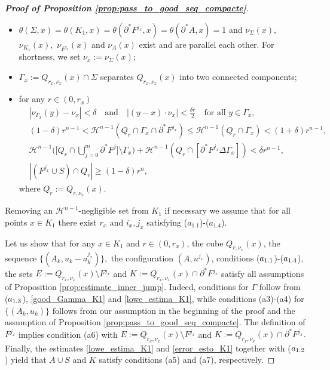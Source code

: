 \documentclass[reqno]{amsart}
\numberwithin{equation}{section}
\theoremstyle{plain}
\theoremstyle{definition}
\newcommand{\cH}{\mathcal{H}}
\newcommand{\p}{\partial}
\begin{document}
\begin{proof}[\textbf{Proof of Proposition \ref{prop:pass_to_good_seq_compacte}}]
\begin{itemize}
\item[($\rm a_{1.2}$)] 
$\theta(\Sigma,x) = \theta(K_1,x) =
\theta(\p^*F^{j_x},x) = 
\theta(\p^*A,x)=1$ and $\nu_{\Sigma}(x),$ $\nu_{K_1}(x),$ $\nu_{F^{j_x}}(x)$ and $\nu_A(x)$ exist and are parallel each other. For shortness, we set $\nu_x:= \nu_\Sigma(x);$
 
 \item[($\rm a_{1.3}$)] $\Gamma_x:=Q_{r_x,\nu_x}(x)\cap\Sigma $ separates $Q_{r_x,\nu_x}(x)$ into two connected components;
 
 \item[($\rm a_{1.4}$)] for any $r\in(0,r_x)$
 \begin{subequations}
 \begin{align}
 & |\nu_{\Gamma_x}(y) - \nu_x|<\delta \quad \text{and}\quad |(y-x)\cdot \nu_x|<\tfrac{\delta r}{2}\quad\text{for all $y\in \Gamma_x,$} \label{good_Gamma_K1}\\
 & (1 - \delta)r^{n-1} < 
 \cH^{n-1}(Q_r \cap  \Gamma_x \cap \p^*F^{j_x})
 \le
 \cH^{n-1}(Q_r\cap \Gamma_x) <(1+\delta)r^{n-1}, \label{lowe_estima_K1}\\
 & \cH^{n-1}\Big(\Big[Q_r \cap \bigcup_{j=0}^m \p^*F^j\Big]\setminus \Gamma_x\Big) +
 \cH^{n-1}(Q_r \cap [\p^*F^{j_x}\Delta \Gamma_x])
 < \delta r^{n-1}, \label{error_esto_K1} \\
 & |(F^{j_x}\cup S)\cap Q_r| \ge (1-\delta)r^n, \label{vol_full_K1}
 \end{align} 
 \end{subequations}
 where $Q_r:=Q_{r,\nu_x}(x).$
\end{itemize}
Removing an $\cH^{n-1}$-negligible set from $K_1$ if necessary we assume that for all points $x\in K_1$ there exist $r_x$ and $i_x,j_x$ satisfying ($a_{1.1}$)-($a_{1.4}$). 

Let us show that for any $x\in K_1$ and $r\in (0,r_x)$, the cube $Q_{r,\nu_x}(x)$, the sequence $\{(A_k,u_k-a_k^{j_x})\},$ the configuration $(A,u^{j_x})$, conditions ($\rm a_{1.1}$)-($\rm a_{1.4}$), the sets $E:=Q_{r_x,\nu_x}(x)\setminus F^{j_x}$ and $K:=Q_{r_x,\nu_x}(x)\cap\p^* F^{j_x}$ satisfy all assumptions of Proposition \ref{prop:estimate_inner_jump}. Indeed, conditions for $\Gamma$ follow from ($\rm a_{1.3}$), \eqref{good_Gamma_K1} and \eqref{lowe_estima_K1}, while conditions (a3)-(a4) for $\{(A_k,u_k)\}$ follows from  our assumption in the beginning of the proof and the assumption of Proposition \ref{prop:pass_to_good_seq_compacte}. The definition of $F^{j_x}$ implies condition (a6) with $E:=Q_{r_x,\nu_x}(x)\setminus F^{j_x}$ and $K:=Q_{r_x,\nu_x}(x)\cap\p^* F^{j_x}.$ Finally, the estimates \eqref{lowe_estima_K1} and \eqref{error_esto_K1} together with ($\rm a_{1.2}$) yield that $A\cup S$ and $K$ satisfy conditions (a5) and (a7), respectively.
\smallskip


\end{proof}
\end{document}

